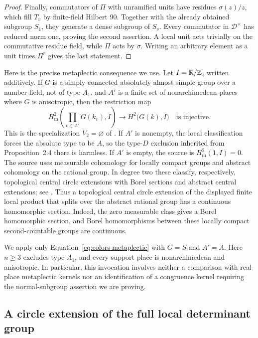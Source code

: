 \begin{proof}
Finally, commutators of $\Pi$ with unramified units have residues
$\sigma(z)/z$, which fill $T_v$ by finite-field Hilbert 90.  Together
with the already obtained subgroup $S_1$, they generate a dense subgroup
of $S_v$.  Every commutator in $\mathcal D^\times$ has reduced norm one,
proving the second assertion.  A local unit acts trivially on the
commutative residue field, while $\Pi$ acts by $\sigma$.  Writing an
arbitrary element as a unit times $\Pi^r$ gives the last statement.
\end{proof}

Here is the precise metaplectic consequence we use.  Let
$I=\mathbb R/\mathbb Z$, written additively.  If $G$ is a simply connected
absolutely almost simple group over a number field, not of type $A_1$,
and $A'$ is a finite set of nonarchimedean places where $G$ is anisotropic,
then the restriction map
\begin{equation}\label{eq:colors-metaplectic}
 H^2_{\mathrm m}\!\left(\prod_{v\in A'}G(k_v),I\right)
 \longrightarrow H^2\bigl(G(k),I\bigr)
 \quad\text{is injective}.
\end{equation}
This is the specialization $V_2=\varnothing$ of
\cite[Proposition~2.6, p.~114]{PRmetaplectic}. If $A'$ is nonempty,
the local classification forces the absolute type to be $A$, so the
type-$D$ exclusion inherited from Proposition~2.4 there is harmless.
If $A'$ is empty, the source is $H^2_{\mathrm m}(1,I)=0$.
The source uses measurable
cohomology for locally compact groups and abstract cohomology on the
rational group.  In degree two these classify, respectively,
topological central circle extensions with Borel sections and abstract
central extensions; see \cite[Section~3.2]{PRsurvey}.  Thus a topological
central circle extension of the displayed finite local product that
splits over the abstract rational group has a continuous homomorphic
section.  Indeed, the zero measurable class gives a Borel homomorphic
section, and Borel homomorphisms between these locally compact
second-countable groups are continuous.

We apply only Equation~\eqref{eq:colors-metaplectic} with $G=S$ and
$A'=A$.  Here $n\geq3$ excludes type $A_1$, and every support place is
nonarchimedean and anisotropic.  In particular, this invocation involves
neither a comparison with real-place metaplectic kernels nor an
identification of a congruence kernel requiring the normal-subgroup
assertion we are proving.

\subsection{A circle extension of the full local determinant group}

